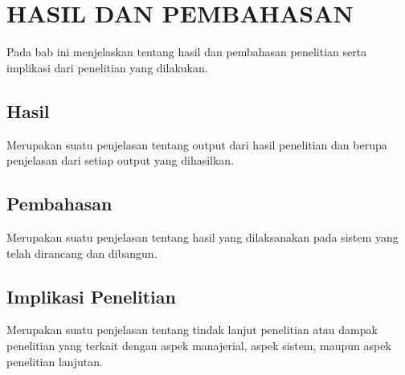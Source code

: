 
\chapter[HASIL DAN PEMBAHASAN]{\\ HASIL DAN PEMBAHASAN}

Pada bab ini menjelaskan tentang hasil dan pembahasan penelitian serta implikasi dari penelitian yang dilakukan.

\section{Hasil}
\begin{sectioncontent}
    \hspace{\parindent}Merupakan suatu penjelasan tentang output dari hasil penelitian dan berupa   penjelasan dari setiap output yang dihasilkan.
\end{sectioncontent}

\section{Pembahasan}
\begin{sectioncontent}
    \hspace{\parindent}Merupakan suatu penjelasan tentang hasil yang dilaksanakan pada sistem yang telah dirancang dan dibangun.
\end{sectioncontent}

\section{Implikasi Penelitian}
\begin{sectioncontent}
    \hspace{\parindent}Merupakan suatu penjelasan tentang tindak lanjut penelitian atau dampak penelitian  yang terkait dengan aspek manajerial, aspek sistem, maupun aspek penelitian lanjutan.
\end{sectioncontent}